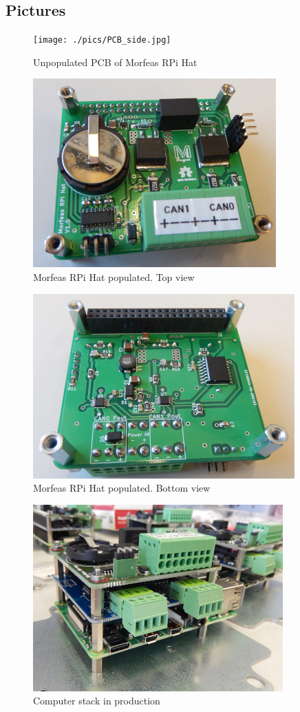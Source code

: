 \subsection{Pictures}
\begin{figure}[ht]
\centering
	\texttt{[image: ./pics/PCB\_side.jpg]}
	\caption{Unpopulated PCB of Morfeas RPi Hat}
\end{figure}
\begin{figure}[ht]
\centering
	\includegraphics[angle=0]{./pics/Morfeas_RPi_HAT_top.png}
	\caption{Morfeas RPi Hat populated. Top view}
\end{figure}
\begin{figure}[ht]
\centering
	\includegraphics[angle=0]{./pics/Morfeas_RPi_HAT_bottom.png}
	\caption{Morfeas RPi Hat populated. Bottom view}
\end{figure}
\begin{figure}[ht]
\centering
	\includegraphics[angle=0]{./pics/Morfeas_stack.png}
	\caption{Computer stack in production}
\end{figure}